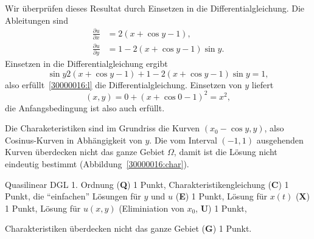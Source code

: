 \begin{loesung}
\begin{teilaufgaben}
Wir überprüfen dieses Resultat durch Einsetzen in die Differentialgleichung.
Die Ableitungen sind
\begin{align*}
\frac{\partial u}{\partial x}
&=
2(x+\cos y - 1),
\\
\frac{\partial u}{\partial y}
&=
1-2(x+\cos y - 1)\sin y.
\end{align*}
Einsetzen in die Differentialgleichung ergibt
\[
\sin y
2(x+\cos y - 1)
+
1-2(x+\cos y - 1)\sin y
=
1,
\]
also erfüllt~\eqref{30000016:l} die Differentialgleichung.
Einsetzen von $y$ liefert
\[
(x,y) = 0 + (x + \cos 0 - 1)^2 = x^2,
\]
die Anfangsbedingung ist also auch erfüllt.
\item
Die Charaketeristiken sind im Grundriss die Kurven $(x_0-\cos y,y)$, also
Cosinus-Kurven in Abhängigkeit von $y$.
Die vom Interval $(-1,1)$ ausgehenden Kurven überdecken nicht das ganze
Gebiet $\Omega$, damit ist die Lösung nicht eindeutig bestimmt
(Abbildung~\ref{30000016:char}).
\qedhere
\end{teilaufgaben}
\end{loesung}

\begin{bewertung}
\begin{teilaufgaben}
\item
Quasilinear DGL 1. Ordnung ({\bf Q}) 1 Punkt,
Charakteristikengleichung ({\bf C}) 1 Punkt,
die ``einfachen'' Lösungen für $y$ und $u$ ({\bf E}) 1 Punkt,
Lösung für $x(t)$ ({\bf X}) 1 Punkt,
Lösung für $u(x,y)$ (Eliminiation von $x_0$, {\bf U}) 1 Punkt,
\item
Charakteristiken überdecken nicht das ganze Gebiet ({\bf G}) 1 Punkt.
\end{teilaufgaben}
\end{bewertung}
